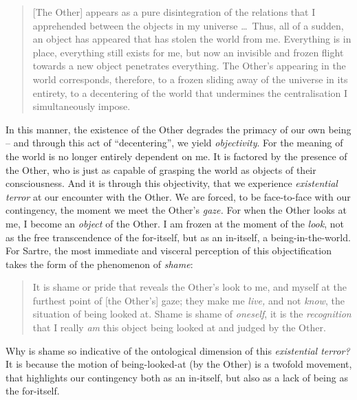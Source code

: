 \blockcquote[350 -- 351]{Sartre}{[The Other] appears as a pure disintegration of the relations that I apprehended between the objects in my universe \ldots\ Thus, all of a sudden, an object has appeared that has stolen the world from me. Everything is in place, everything still exists for me, but now an invisible and frozen flight towards a new object penetrates everything. The Other's appearing in the world corresponds, therefore, to a frozen sliding away of the universe in its entirety, to a decentering of the world that undermines the centralisation I simultaneously impose.}

\noindent
In this manner, the existence of the Other degrades the primacy of our own being -- and through this act of \enquote{decentering}, we yield \emph{objectivity}. For the meaning of the world is no longer entirely dependent on me. It is factored by the presence of the Other, who is just as capable of grasping the world as objects of their consciousness. And it is through this objectivity, that we experience \emph{existential terror} at our encounter with the Other. We are forced, to be face-to-face with our contingency, the moment we meet the Other's \emph{gaze.} For when the Other looks at me, I become an \emph{object} of the Other. I am frozen at the moment of the \emph{look}, not as the free transcendence of the for-itself, but as an in-itself, a being-in-the-world. For Sartre, the most immediate and visceral perception of this objectification takes the form of the phenomenon of \emph{shame}:

\blockcquote[357 -- 358]{Sartre}{It is shame or pride that reveals the Other's look to me, and myself at the furthest point of [the Other's] gaze; they make me \emph{live,} and not \emph{know}, the situation of being looked at. Shame is shame of \emph{oneself}, it is the \emph{recognition} that I really \emph{am} this object being looked at and judged by the Other.}

\noindent
Why is shame so indicative of the ontological dimension of this \emph{existential terror?} It is because the motion of being-looked-at (by the Other) is a twofold movement, that highlights our contingency both as an in-itself, but also as a lack of being as the for-itself.

